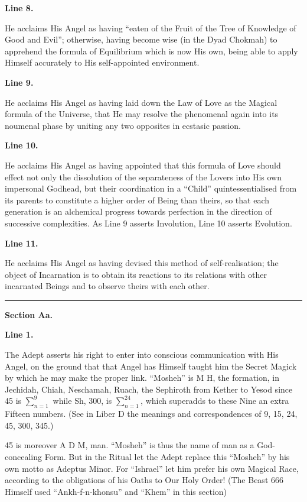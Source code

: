 \textbf{Line 8.}


He acclaims His Angel as having \enquote{eaten of the Fruit of the Tree of Knowledge of Good and Evil}; otherwise, having become wise (in the Dyad Chokmah) to apprehend the formula of Equilibrium which is now His own, being able to apply Himself accurately to His self-appointed environment.


\textbf{Line 9.}


He acclaims His Angel as having laid down the Law of Love as the Magical formula of the Universe, that He may resolve the phenomenal again into its noumenal phase by uniting any two opposites in ecstasic passion.


\textbf{Line 10.}


He acclaims His Angel as having appointed that this formula of Love should effect not only the dissolution of the separateness of the Lovers into His own impersonal Godhead, but their coordination in a \enquote{Child} quintessentialised from its parents to constitute a higher order of Being than theirs, so that each generation is an alchemical progress towards perfection in the direction of successive complexities. As Line 9 asserts Involution, Line 10 asserts Evolution.


\textbf{Line 11.}

He acclaims His Angel as having devised this method of self-realisation; the object of Incarnation is to obtain its reactions to its relations with other incarnated Beings and to observe theirs with each other.

\begin{center}
\rule{1in}{0.5pt}
\end{center}

\pagebreak[1]
\textbf{Section Aa.}

\textbf{Line 1.}


The Adept asserts his right to enter into conscious communication with His Angel, on the ground that that Angel has Himself taught him the Secret Magick by which he may make the proper link. \enquote{Mosheh} is M H, the formation, in Jechidah, Chiah, Neschamah, Ruach, \textemdash{} the Sephiroth from Kether to Yesod \textemdash{} since 45 is $\sum_{n=1}^{9}$ while Sh, 300, is $\sum_{n=1}^{24}$, which superadds to these Nine an extra Fifteen numbers. (See in Liber D the meanings and correspondences of 9, 15, 24, 45, 300, 345.)

45 is moreover A D M, man. \enquote{Mosheh} is thus the name of man as a God-concealing Form. But in the Ritual let the Adept replace this \enquote{Mosheh} by his own motto as Adeptus Minor. For \enquote{Ishrael} let him prefer his own Magical Race, according to the obligations of his Oaths to Our Holy Order! (The Beast 666 Himself used \enquote{Ankh-f-n-khonsu} and \enquote{Khem} in this section)


